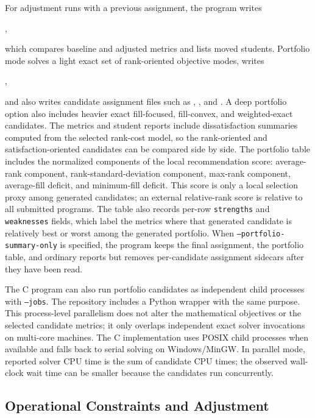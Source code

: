 \documentclass[11pt,a4paper]{article}
\begin{document}
For adjustment runs with a previous assignment, the program writes
\begin{center}
  {\small{}},
\end{center}
which compares baseline and adjusted metrics and lists moved students.
Portfolio mode solves a light exact set of rank-oriented objective modes, writes
\begin{center}
  {\small{}},
\end{center}
and also writes candidate assignment files such as
, , and
.  A deep portfolio option also includes heavier
exact fill-focused, fill-convex, and weighted-exact candidates.  The metrics
and student reports include dissatisfaction summaries computed from the
selected rank-cost model, so the rank-oriented and satisfaction-oriented
candidates can be compared side by side.  The portfolio table includes the
normalized components of the local recommendation score: average-rank
component, rank-standard-deviation component, max-rank component,
average-fill deficit, and minimum-fill deficit.  This score is only a local
selection proxy among generated candidates; an external relative-rank score is
relative to all submitted programs.  The table also records per-row
\texttt{strengths} and \texttt{weaknesses} fields, which label the metrics
where that generated candidate is relatively best or worst among the generated
portfolio.  When \texttt{--portfolio-summary-only} is
specified, the program keeps the final assignment, the portfolio table, and
ordinary reports but removes per-candidate assignment sidecars after they have
been read.

The C program can also run portfolio candidates as independent child
processes with \texttt{--jobs}.  The repository includes a Python wrapper with
the same purpose.  This process-level parallelism does not alter the
mathematical objectives or the selected candidate metrics; it only overlaps
independent exact solver invocations on multi-core machines.  The C
implementation uses POSIX child processes when available and falls back to
serial solving on Windows/MinGW.  In parallel mode, reported solver CPU time
is the sum of candidate CPU times; the observed wall-clock wait time can be
smaller because the candidates run concurrently.

\subsection{Operational Constraints and Adjustment}
\end{document}

